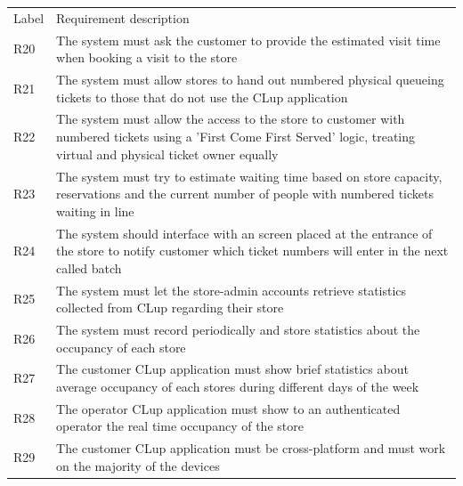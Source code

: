 \begin{tabular}{C{1cm}L{14.1cm}}
    Label & Requirement description                                                                                                                                                         \\
    R20   & The system  must ask the customer to provide the estimated visit time when booking a visit to the store                                                                                \\
    R21   & The system must allow stores to hand out numbered physical queueing tickets to those that do not use the CLup application                                                       \\
    R22   & The system must allow the access to the store to customer with numbered tickets using a 'First Come First Served' logic, treating virtual and physical ticket owner equally       \\
    R23   & The system must try to estimate waiting time based on store capacity, reservations and the current number of people with numbered tickets waiting in line                       \\
    R24   & The system should interface with an screen placed at the entrance of the store to notify customer which ticket numbers will enter in the next called batch                                              \\
    R25   & The system must let the store-admin accounts retrieve statistics collected from CLup regarding their store                                                                      \\
    R26   & The system must record periodically and store statistics about the occupancy of each store                                                                                      \\
    R27   & The customer CLup application must show brief statistics about average occupancy of each stores during different days of the week                                               \\
    R28   & The operator CLup application must show to an authenticated operator the real time occupancy of the store                                                                       \\
    R29   & The customer CLup application must be cross-platform and must work on the majority of the devices                                                                               \\

\end{tabular}
